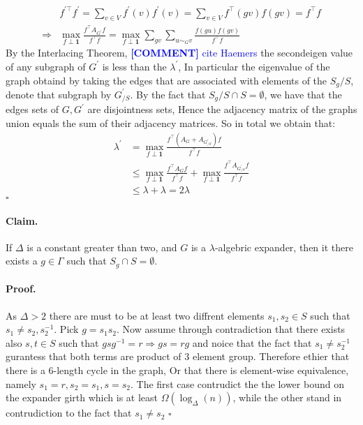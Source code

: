 \documentclass{article}
\newcommand{\commentt}[1]{\textcolor{blue}{ \textbf{[COMMENT]} #1}}
\newcommand{\ctt}[1]{\commentt{#1}}
\begin{document}
\begin{multicols*}{2}
  \begin{equation*}
    \begin{split}
     &  f^{\prime \top}f^{\prime}   = \sum_{v \in V}f^{\prime}\left( v \right)f^{\prime}\left( v \right)   =   \sum_{v \in V } f^{\top}\left( gv \right)f\left( gv \right) = f^{\top}f \\
     \Rightarrow  &  \max_{f \perp \mathbf{1}} { \frac{f^{\top}A_{G^{\prime}} f  }{ f^{\top}f}} =\max_{f \perp \mathbf{1}} { \sum_{gv}\sum_{ u\sim_{G} v }\frac{f\left( gu \right) f \left( gv \right)  }{ f^{\top}f}} 
    \end{split}
  \end{equation*}
  By the Interlacing Theorem, \ctt{cite Haemers} the secondeigen value of any subgraph of $G^{\prime}$ is less than the $\lambda^{\prime}$, In particular the eigenvalue of the graph obtaind by taking the edges that are associated with elements of the $ S_{g} / S $, denote that subgraph by $G^{\prime}_{ / S}$.  By the fact that $S_{g} / S \cap S = \emptyset $, we have that the edges sets of $G,G^{\prime}$ are disjointness sets, Hence the adjacency matrix of the graphs union equals the sum of their adjacency matrices. So in total we obtain that:  
    \begin{equation*}
    \begin{split}
      \lambda^{\prime} &= \max_{f \perp \mathbf{1}} { \frac{f^{\top} \left( A_{G} + A_{G^{\prime}_{/S}} \right) f  }{ f^{\top}f}} \\
      & \le  \max_{f \perp \mathbf{1}} { \frac{f^{\top}A_{G} f  }{ f^{\top}f}} +  \max_{f \perp \mathbf{1}} { \frac{f^{\top}A_{G^{\prime}_{/S}} f  }{ f^{\top}f}} \\
      & \le \lambda + \lambda = 2\lambda
    \end{split}
  \end{equation*} 
  $\square$ 
  \paragraph{Claim.} If $\Delta$ is a constant greater than two, and $G$ is a $\lambda$-algebric expander, then it there exists a $g \in \Gamma$ such that $S_{g}\cap S = \emptyset$.  
  \paragraph{Proof.} As $\Delta > 2 $ there are must to be at least two diffrent elements $s_{1},s_{2} \in S$  such that $s_{1} \neq s_{2}, s_{2}^{-1}$. Pick $g = s_{1}s_{2}$. Now assume through contradiction that there exists also $s,t \in S$ such that $gsg^{-1} = r \Rightarrow gs = rg$ and noice that the fact that $s_{1}\neq s_{2}^{-1}$ gurantess that both terms are product of $3$ element group. Therefore ethier that there is a $6$-length cycle in the graph, Or that there is element-wise equivalence, namely $s_{1} = r, s_{2} = s_{1}, s=s_{2}$. The first case contrudict the the lower bound on the expander girth which is at least $\Omega \left( \log_{\Delta}(n) \right)$, while the other stand in contrudiction to the fact that $s_{1} \neq s_{2}$ $\square$  

\end{multicols*}
\end{document}
